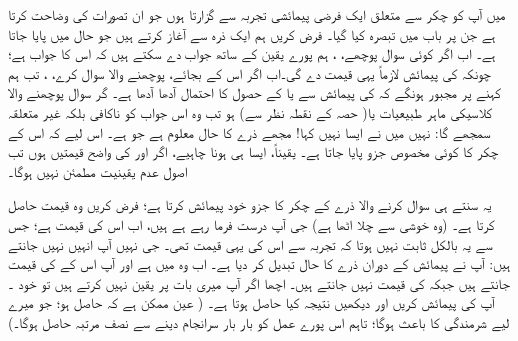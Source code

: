میں آپ کو     چکر سے متعلق ایک فرضی  پیمائشی  تجربہ  سے گزارتا ہوں جو  ان تصورات  کی وضاحت کرتا ہے جن پر باب   میں  تبصرہ  کیا گیا۔ فرض کریں ہم  ایک ذرہ سے آغاز کرتے ہیں جو   حال میں پایا جاتا ہے۔ اب اگر کوئی سوال  پوچھے، ،   ہم پورے یقین کے ساتھ جواب دے سکتے ہیں کہ اس کا جواب   
    ہے؛  چونکہ    کی پیمائش  لازماً  یہی قیمت دے گی۔اب اگر  اس کے بجائے،  پوچھنے والا سوال کرے، ،  تب ہم  کہنے پر مجبور ہونگے کہ     کی پیمائش سے       یا     کے حصول کا احتمال آدھا آدھا ہے۔ گر  سوال پوچھنے والا کلاسیکی ماہر  طبیعیات       
 یا( حصہ  کے نقطہ نظر  سے)    ہو تب  وہ اس جواب کو ناکافی بلکہ غیر متعلقہ  سمجھے گا:    نہیں میں نے ایسا  نہیں کہا!  مجھے ذرے کا حال    معلوم ہے جو     ہے۔   اس لیے کہ اس کے چکر کا کوئی مخصوص  جزو  پایا جاتا ہے۔ یقیناً، ایسا ہی ہونا چاہیے،   اگر    اور   کی واضح  قیمتیں     ہوں تب اصول عدم یقینیت مطمئن  نہیں ہوگا۔
 
  یہ سنتے ہی سوال کرنے والا ذرے کے چکر کا    جزو    خود پیمائش کرتا ہے؛   فرض کریں  وہ     قیمت حاصل کرتا ہے۔ (وہ خوشی  سے چلا اٹھا ہے)   جی آپ درست فرما  رہے ہے  ہیں،  اب اس کی   قیمت ہے؛ جس سے یہ بالکل ثابت نہیں ہوتا کہ تجربہ سے   اس کی یہی قیمت تھی۔   جی نہیں آپ انہیں نہیں  جانتے   ہیں:  آپ نے پیمائش کے دوران ذرے کا حال تبدیل کر دیا ہے۔ اب وہ     میں ہے    اور    آپ اس کے   کی قیمت جانتے ہیں جبکہ     کی قیمت  نہیں جانتے ہیں۔ اچھا اگر آپ میری بات پر یقین نہیں کرتے ہیں  تو خود ۔ آپ   کی پیمائش کریں اور دیکھیں نتیجہ کیا حاصل ہوتا ہے۔ ( عین ممکن ہے
  کہ    حاصل ہو؛  جو میرے لیے شرمندگی کا باعث  ہوگا؛ تاہم  اس پورے عمل کو بار بار  سرانجام دینے سے   نصف   مرتبہ     حاصل ہوگا۔)
  
